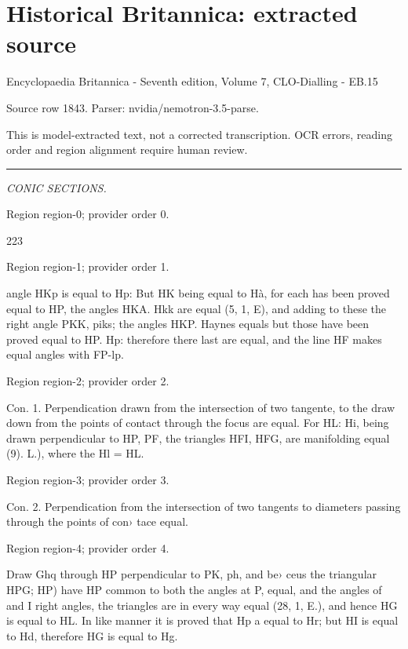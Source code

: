 \documentclass[11pt]{article}
\begin{document}
\section*{Historical Britannica: extracted source}
Encyclopaedia Britannica - Seventh edition, Volume 7, CLO-Dialling - EB.15\par
{\small Source row 1843. Parser: nvidia/nemotron-3.5-parse.\par}
{\small This is model-extracted text, not a corrected transcription. OCR errors, reading order and region alignment require human review.\par}
\hrule\medskip
{\small\itshape CONIC SECTIONS.\par}

{\scriptsize\color{gray} Region region-0; provider order 0.\par}
\medskip

223
\par

{\scriptsize\color{gray} Region region-1; provider order 1.\par}
\medskip

angle HKp is equal to Hp: But HK being equal to Hà, for each has been proved equal to HP, the angles HKA. Hkk are equal (5, 1, E), and adding to these the right angle PKK, piks; the angles HKP. Haynes equals but those have been proved equal to HP. Hp: therefore there last are equal, and the line HF makes equal angles with FP-lp.
\par

{\scriptsize\color{gray} Region region-2; provider order 2.\par}
\medskip

Con. 1. Perpendication drawn from the intersection of two tangente, to the draw down from the points of contact through the focus are equal. For HL: Hi, being drawn perpendicular to HP, PF, the triangles HFI, HFG, are manifolding equal (9). L.), where the Hl = HL.
\par

{\scriptsize\color{gray} Region region-3; provider order 3.\par}
\medskip

Con. 2. Perpendication from the intersection of two tangents to diameters passing through the points of con› tace equal.
\par

{\scriptsize\color{gray} Region region-4; provider order 4.\par}
\medskip

Draw Ghq through HP perpendicular to PK, ph, and be› ceus the triangular HPG; HP) have HP common to both the angles at P, equal, and the angles of and I right angles, the triangles are in every way equal (28, 1, E.), and hence HG is equal to HL. In like manner it is proved that Hp a equal to Hr; but HI is equal to Hd, therefore HG is equal to Hg.
\par
\end{document}
